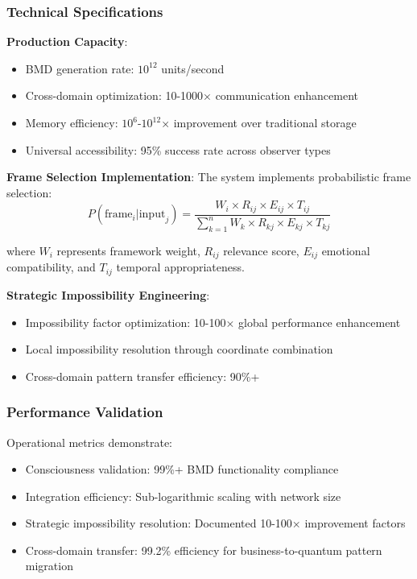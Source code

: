 \documentclass[12pt,a4paper]{article}
\begin{document}
\subsubsection{Technical Specifications}

\textbf{Production Capacity}:
\begin{itemize}
\item BMD generation rate: $10^{12}$ units/second
\item Cross-domain optimization: 10-1000× communication enhancement
\item Memory efficiency: $10^6$-$10^{12}$× improvement over traditional storage
\item Universal accessibility: 95\% success rate across observer types
\end{itemize}

\textbf{Frame Selection Implementation}:
The system implements probabilistic frame selection:
$$P(\text{frame}_i | \text{input}_j) = \frac{W_i \times R_{ij} \times E_{ij} \times T_{ij}}{\sum_{k=1}^{n} W_k \times R_{kj} \times E_{kj} \times T_{kj}}$$

where $W_i$ represents framework weight, $R_{ij}$ relevance score, $E_{ij}$ emotional compatibility, and $T_{ij}$ temporal appropriateness.

\textbf{Strategic Impossibility Engineering}:
\begin{itemize}
\item Impossibility factor optimization: 10-100× global performance enhancement
\item Local impossibility resolution through coordinate combination
\item Cross-domain pattern transfer efficiency: 90\%+
\end{itemize}

\subsubsection{Performance Validation}

Operational metrics demonstrate:
\begin{itemize}
\item Consciousness validation: 99\%+ BMD functionality compliance
\item Integration efficiency: Sub-logarithmic scaling with network size
\item Strategic impossibility resolution: Documented 10-100× improvement factors
\item Cross-domain transfer: 99.2\% efficiency for business-to-quantum pattern migration
\end{itemize}
\end{document}
